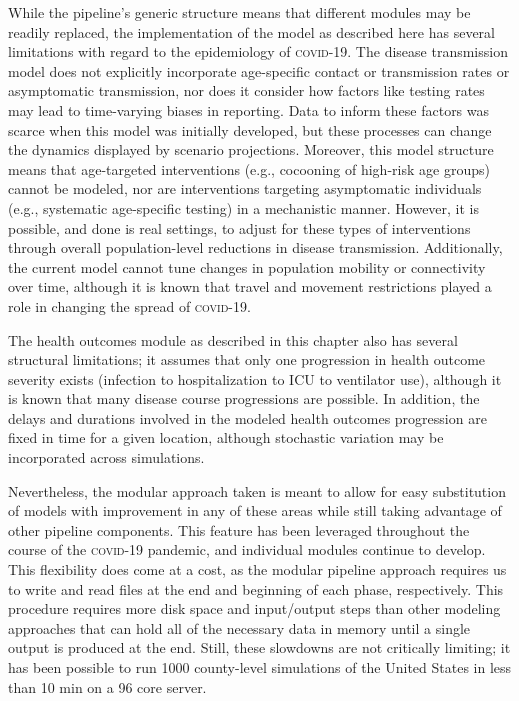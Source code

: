 {While the pipeline’s generic structure means that different modules may be readily replaced, the implementation of the model as described here has several limitations with regard to the epidemiology of \textsc{covid}-19. The disease transmission model does not explicitly incorporate age-specific contact or transmission rates or asymptomatic transmission, nor does it consider how factors like testing rates may lead to time-varying biases in reporting. Data to inform these factors was scarce when this model was initially developed, but these processes can change the dynamics displayed by scenario projections. Moreover, this model structure means that age-targeted interventions  (e.g., cocooning of high-risk age groups) cannot be modeled, nor are interventions targeting asymptomatic individuals (e.g., systematic age-specific testing) in a mechanistic manner. However, it is possible, and done is real settings, to adjust for these types of interventions through overall population-level reductions in disease transmission. Additionally, the current model cannot tune changes in population mobility or connectivity over time, although it is known that travel and movement restrictions played a role in changing the spread of \textsc{covid}-19.

The health outcomes module as described in this chapter also has several structural limitations; it assumes that only one progression in health outcome severity exists (infection to hospitalization to ICU to ventilator use), although it is known that many disease course progressions are possible. In addition, the delays and durations involved in the modeled health outcomes progression are fixed in time for a given location, although stochastic variation may be incorporated across simulations.

Nevertheless, the modular approach taken is meant to allow for easy substitution of models with improvement in any of these areas while still taking advantage of other pipeline components. This feature has been leveraged throughout the course of the \textsc{covid}-19 pandemic, and individual modules continue to develop. This flexibility does come at a cost, as the modular pipeline approach requires us to write and read files at the end and beginning of each phase, respectively. This procedure requires more disk space and input/output steps than other modeling approaches that can hold all of the necessary data in memory until a single output is produced at the end. Still, these slowdowns are not critically limiting; it has been possible to run 1000 county-level simulations of the United States in less than 10 min on a 96 core server.

}

